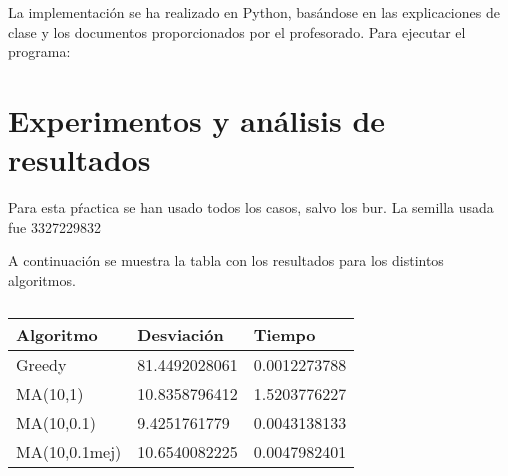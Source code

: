\documentclass[twoside]{article}
\begin{document}
La implementación se ha realizado en Python, basándose en las explicaciones
de clase y los documentos proporcionados por el profesorado. Para ejecutar el programa:


\section{Experimentos y análisis de resultados}

Para esta pŕactica se han usado todos los casos, salvo los bur. La semilla
usada fue 3327229832

A continuación se muestra la tabla con los resultados para los distintos algoritmos.

\begin{table}[h]
\centering
    \begin{tabular}{lll}
    \toprule
    Algoritmo               & Desviación & Tiempo \\
    \midrule
Greedy&81.4492028061&0.0012273788\\
MA(10,1)&10.8358796412&1.5203776227\\
MA(10,0.1)&9.4251761779&0.0043138133\\
MA(10,0.1mej)&10.6540082225&0.0047982401\\
    \bottomrule
    \end{tabular}
    \caption{}
\end{table}
\end{document}
